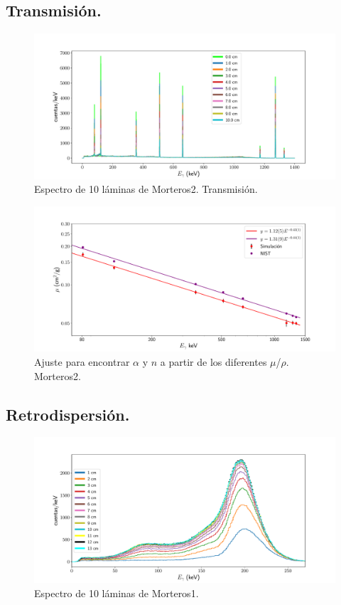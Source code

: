  \subsection{Transmisión.}
 
\begin{figure}[H]
	\centering
	\includegraphics[width=1.0\linewidth]{Kap4/espectro_m2-10M-trans.pdf}
	\caption{Espectro de 10 láminas de Morteros2. Transmisión.}
	\label{fig:espectrom2-10m-trans}
\end{figure}
 
 
\begin{figure}[H]
	\centering
	\includegraphics[width=1.0\linewidth]{Kap4/mu-trans-m2.pdf}
	\caption{Ajuste para encontrar $\alpha$ y $n$ a partir de los diferentes $\mu$/$\rho$. Morteros2.}
	\label{fig:mu-trans-m2}
\end{figure}
 
 
 \subsection{Retrodispersión.}
 
 
\begin{figure}[H]
	\centering
	\includegraphics[width=1.0\linewidth]{Kap4/espectro_m2.pdf}
	\caption{Espectro de 10 láminas de Morteros1.}
	\label{fig:espectrom2}
\end{figure}
 
